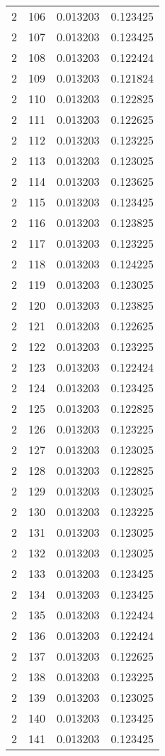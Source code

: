 \begin{longtable}{rrrr}
2 & 106 & 0.013203 & 0.123425 \\
2 & 107 & 0.013203 & 0.123425 \\
2 & 108 & 0.013203 & 0.122424 \\
2 & 109 & 0.013203 & 0.121824 \\
2 & 110 & 0.013203 & 0.122825 \\
2 & 111 & 0.013203 & 0.122625 \\
2 & 112 & 0.013203 & 0.123225 \\
2 & 113 & 0.013203 & 0.123025 \\
2 & 114 & 0.013203 & 0.123625 \\
2 & 115 & 0.013203 & 0.123425 \\
2 & 116 & 0.013203 & 0.123825 \\
2 & 117 & 0.013203 & 0.123225 \\
2 & 118 & 0.013203 & 0.124225 \\
2 & 119 & 0.013203 & 0.123025 \\
2 & 120 & 0.013203 & 0.123825 \\
2 & 121 & 0.013203 & 0.122625 \\
2 & 122 & 0.013203 & 0.123225 \\
2 & 123 & 0.013203 & 0.122424 \\
2 & 124 & 0.013203 & 0.123425 \\
2 & 125 & 0.013203 & 0.122825 \\
2 & 126 & 0.013203 & 0.123225 \\
2 & 127 & 0.013203 & 0.123025 \\
2 & 128 & 0.013203 & 0.122825 \\
2 & 129 & 0.013203 & 0.123025 \\
2 & 130 & 0.013203 & 0.123225 \\
2 & 131 & 0.013203 & 0.123025 \\
2 & 132 & 0.013203 & 0.123025 \\
2 & 133 & 0.013203 & 0.123425 \\
2 & 134 & 0.013203 & 0.123425 \\
2 & 135 & 0.013203 & 0.122424 \\
2 & 136 & 0.013203 & 0.122424 \\
2 & 137 & 0.013203 & 0.122625 \\
2 & 138 & 0.013203 & 0.123225 \\
2 & 139 & 0.013203 & 0.123025 \\
2 & 140 & 0.013203 & 0.123425 \\
2 & 141 & 0.013203 & 0.123425 \\

\end{longtable}
